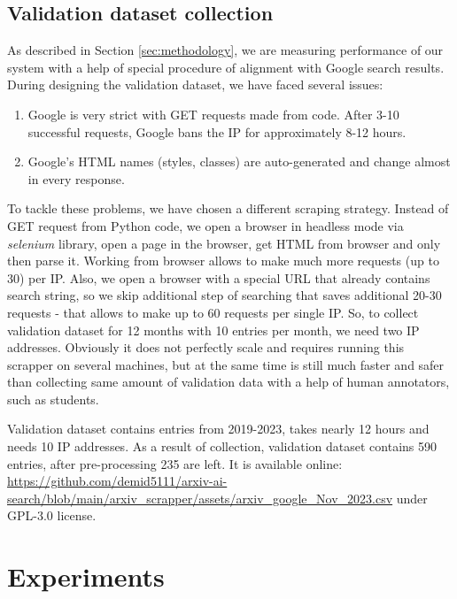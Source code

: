 \documentclass{article}
\begin{document}
    
    \subsection{Validation dataset collection}

        As described in Section \ref{sec:methodology}, we are measuring performance of our system with a help of special procedure of alignment with Google search results. During designing the validation dataset, we have faced several issues:
        
        \begin{enumerate}
            \item Google is very strict with GET requests made from code. After 3-10 successful requests, Google bans the IP for approximately 8-12 hours.
            \item Google's HTML names (styles, classes) are auto-generated and change almost in every response. 
        \end{enumerate}

        To tackle these problems, we have chosen a different scraping strategy. Instead of GET request from Python code, we open a browser in headless mode via \textit{selenium} library, open a page in the browser, get HTML from browser and only then parse it. Working from browser allows to make much more requests (up to 30) per IP. Also, we open a browser with a special URL that already contains search string, so we skip additional step of searching that saves additional 20-30 requests - that allows to make up to 60 requests per single IP. So, to collect validation dataset for 12 months with 10 entries per month, we need two IP addresses. Obviously it does not perfectly scale and requires running this scrapper on several machines, but at the same time is still much faster and safer than collecting same amount of validation data with a help of human annotators, such as students.

        Validation dataset contains entries from 2019-2023, takes nearly 12 hours and needs 10 IP addresses. As a result of collection, validation dataset contains 590 entries, after pre-processing 235 are left. It is available online: \url{https://github.com/demid5111/arxiv-ai-search/blob/main/arxiv_scrapper/assets/arxiv_google_Nov_2023.csv} under GPL-3.0 license.

\section{Experiments}
\end{document}
